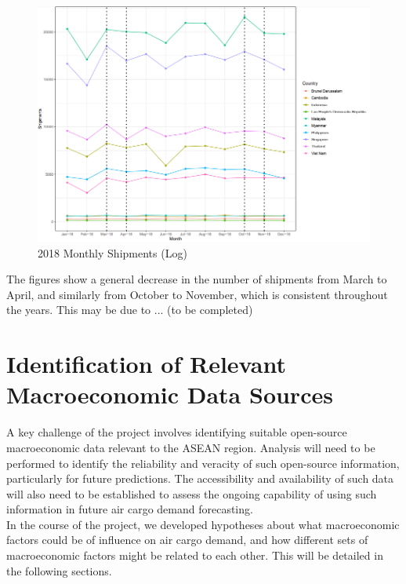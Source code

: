 \documentclass{article}
\begin{document}
\begin{figure}[H]
\centering
\includegraphics[width=1\textwidth]{images/Line Plots/Seasonal/2018_seasonal_log.png}
\caption{2018 Monthly Shipments (Log)}
\end{figure}

\noindent The figures show a general decrease in the number of shipments from March to April, and similarly from October to November, which is consistent throughout the years. This may be due to ... (to be completed)

\newpage

\section{Identification of Relevant Macroeconomic Data Sources}

A key challenge of the project involves identifying suitable open-source macroeconomic data relevant to the ASEAN region. Analysis will need to be performed to identify the reliability and veracity of such open-source information, particularly for future predictions. The accessibility and availability of such data will also need to be established to assess the ongoing capability of using such information in future air cargo demand forecasting. \\

\noindent In the course of the project, we developed hypotheses about what macroeconomic factors could be of influence on air cargo demand, and how different sets of macroeconomic factors might be related to each other. This will be detailed in the following sections. \\
\end{document}
